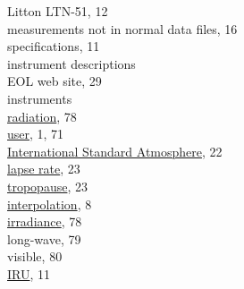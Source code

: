 \documentclass[
]{article}
\begin{document}
\hspace*{0.333em}\hspace*{0.333em}Litton LTN-51, 12\\
\hspace*{0.333em}\hspace*{0.333em}measurements not in normal data files,
16\\
\hspace*{0.333em}\hspace*{0.333em}specifications, 11\\
instrument descriptions\\
\hspace*{0.333em}\hspace*{0.333em}EOL web site, 29\\
instruments\\
\hspace*{0.333em}\hspace*{0.333em}\href{./8-radiation-variables.html}{radiation},
78\\
\hspace*{0.333em}\hspace*{0.333em}\href{./6-air-chemistry-measurements.html\#awas-cims-qcls-toga}{user},
1, 71\\
\href{./3-the-state-of-the-aircraft.html\#palt}{International Standard
Atmosphere}, 22\\
\hspace*{0.333em}\hspace*{0.333em}\href{./3-the-state-of-the-aircraft.html\#palt}{lapse
rate}, 23\\
\hspace*{0.333em}\hspace*{0.333em}\href{./3-the-state-of-the-aircraft.html\#palt}{tropopause},
23\\
\href{./2-general-information-about-data-files.html\#synchronization-of-measurements}{interpolation},
8\\
\href{./8-radiation-measurements.html\#measurements-of-irradiance-and-radiometric-temperature}{irradiance},
78\\
\hspace*{0.333em}\hspace*{0.333em}long-wave, 79\\
\hspace*{0.333em}\hspace*{0.333em}visible, 80\\
\href{./3-the-state-of-the-aircraft.html\#inertial-reference-systems}{IRU},
11\\
\end{document}
